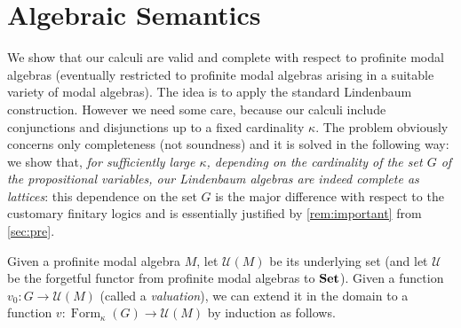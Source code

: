 \documentclass{article}
\theoremstyle{definition}
\DeclareMathOperator{\Formulas}{Form}
\begin{document}
\section{Algebraic Semantics}\label{sec:sem}


We show that our calculi are valid and complete with respect to profinite modal algebras (eventually restricted to profinite modal algebras arising in a suitable variety of modal algebras). The idea is to apply the standard Lindenbaum construction. However we need some care, because our calculi include conjunctions and disjunctions up to a fixed cardinality $\kappa$. The problem obviously concerns only completeness (not soundness) and it is solved in the following way: we show that, \emph{for sufficiently large $\kappa$, depending on the cardinality of the set $G$ of the propositional variables, our Lindenbaum algebras are indeed complete as lattices}: this dependence on the set $G$ is the major difference with respect to the customary finitary logics and is essentially justified by \cref{rem:important} from \cref{sec:pre}.


Given a profinite modal algebra $M$, let $\mathcal{U}(M)$
be its underlying set (and let $\mathcal{U}$ be the forgetful functor from profinite modal algebras to $\bf Set$).
%
 Given a function $v_0  \colon G \longrightarrow \mathcal{U}(M)$ (called a \emph{valuation}), we can extend it in the domain to a function $v \colon \Formulas_\kappa(G) \longrightarrow \mathcal{U}(M)$ by induction as follows.
 
\end{document}
